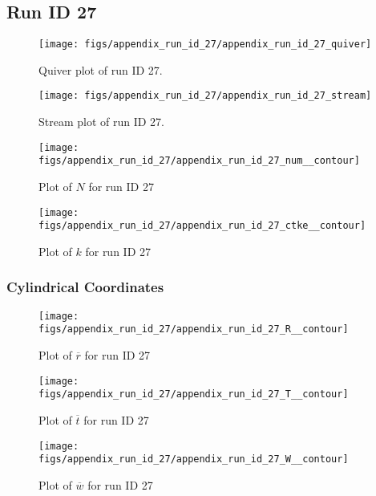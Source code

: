 \subsection{Run ID 27}
\begin{figure}[H]
\centering
\texttt{[image: figs/appendix\_run\_id\_27/appendix\_run\_id\_27\_quiver]}
\caption{Quiver plot of run ID 27.}
\label{fig:appendix_run_id_27_quiver}
\end{figure}


\begin{figure}[H]
\centering
\texttt{[image: figs/appendix\_run\_id\_27/appendix\_run\_id\_27\_stream]}
\caption{Stream plot of run ID 27.}
\label{fig:appendix_run_id_27_stream}
\end{figure}


\begin{figure}[H]
\centering
\texttt{[image: figs/appendix\_run\_id\_27/appendix\_run\_id\_27\_num\_\_contour]}
\caption{Plot of $N$ for run ID 27}
\label{fig:appendix_run_id_27_num__contour}
\end{figure}


\begin{figure}[H]
\centering
\texttt{[image: figs/appendix\_run\_id\_27/appendix\_run\_id\_27\_ctke\_\_contour]}
\caption{Plot of $k$ for run ID 27}
\label{fig:appendix_run_id_27_ctke__contour}
\end{figure}


\subsubsection{Cylindrical Coordinates}
\begin{figure}[H]
\centering
\texttt{[image: figs/appendix\_run\_id\_27/appendix\_run\_id\_27\_R\_\_contour]}
\caption{Plot of $\overline{r}$ for run ID 27}
\label{fig:appendix_run_id_27_R__contour}
\end{figure}


\begin{figure}[H]
\centering
\texttt{[image: figs/appendix\_run\_id\_27/appendix\_run\_id\_27\_T\_\_contour]}
\caption{Plot of $\overline{t}$ for run ID 27}
\label{fig:appendix_run_id_27_T__contour}
\end{figure}


\begin{figure}[H]
\centering
\texttt{[image: figs/appendix\_run\_id\_27/appendix\_run\_id\_27\_W\_\_contour]}
\caption{Plot of $\overline{w}$ for run ID 27}
\label{fig:appendix_run_id_27_W__contour}
\end{figure}


